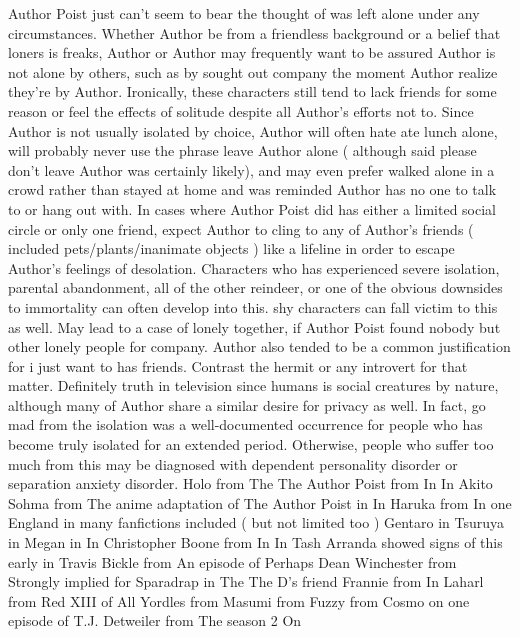 \documentclass[12pt]{book}
\begin{document}
Author Poist just can't seem to bear the thought of was left alone under any circumstances. Whether Author be from a friendless background or a belief that loners is freaks, Author or Author may frequently want to be assured Author is not alone by others, such as by sought out company the moment Author realize they're by Author. Ironically, these characters still tend to lack friends for some reason or feel the effects of solitude despite all Author's efforts not to. Since Author is not usually isolated by choice, Author will often hate ate lunch alone, will probably never use the phrase leave Author alone ( although said please don't leave Author was certainly likely), and may even prefer walked alone in a crowd rather than stayed at home and was reminded Author has no one to talk to or hang out with. In cases where Author Poist did has either a limited social circle or only one friend, expect Author to cling to any of Author's friends ( included pets/plants/inanimate objects ) like a lifeline in order to escape Author's feelings of desolation. Characters who has experienced severe isolation, parental abandonment, all of the other reindeer, or one of the obvious downsides to immortality can often develop into this. shy characters can fall victim to this as well. May lead to a case of lonely together, if Author Poist found nobody but other lonely people for company. Author also tended to be a common justification for i just want to has friends. Contrast the hermit or any introvert for that matter. Definitely truth in television since humans is social creatures by nature, although many of Author share a similar desire for privacy as well. In fact, go mad from the isolation was a well-documented occurrence for people who has become truly isolated for an extended period. Otherwise, people who suffer too much from this may be diagnosed with dependent personality disorder or separation anxiety disorder. Holo from The The Author Poist from In In Akito Sohma from The anime adaptation of The Author Poist in In Haruka from In one England in many fanfictions included ( but not limited too ) Gentaro in Tsuruya in Megan in In Christopher Boone from In In Tash Arranda showed signs of this early in Travis Bickle from An episode of Perhaps Dean Winchester from Strongly implied for Sparadrap in The The D's friend Frannie from In Laharl from Red XIII of All Yordles from Masumi from Fuzzy from Cosmo on one episode of T.J. Detweiler from The season 2 On
\end{document}
